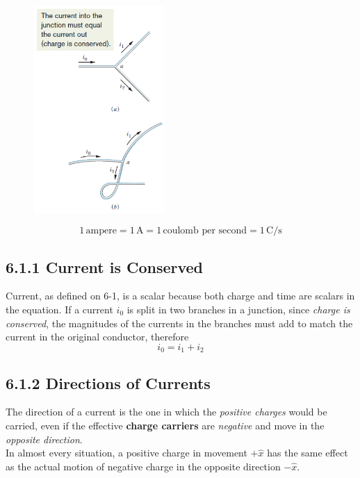 \documentclass[12pt, a4paper]{article}
\begin{document}
		\begin{figure}
			\centering
			\includegraphics[width=5cm]{Physics2_PNGs/current-is-conserved.png}
			\caption*{}
			\label{fig:current-is-conserved.png}
		\end{figure}
		
		\[
			1 \, \text{ampere} = 1 \, \text{A} = 1 \, \text{coulomb per second}
			= 1 \, \text{C} / \text{s}
		\]
		
		\subsection*{6.1.1 Current is Conserved}
		

		Current, as defined on 6-1, is a scalar because both charge and time are scalars in the equation. If a current $i_0$ is split in two branches in a junction, since \textit{charge is conserved}, the magnitudes of the currents in the branches must add to match the current in the original conductor, therefore
		\[
			i_0 = i_1 + i_2
			\tag{First Law of Kirchhoff, 6-3}
		\]
		
		
		\subsection*{6.1.2 Directions of Currents}
		
		The direction of a current is the one in which the \textit{positive charges} would be carried, even if the effective \textbf{charge carriers} are \textit{negative} and move in the \textit{opposite direction}. \\
		In almost every situation, a positive charge in movement $+ \hat{x}$ has the same effect as the actual motion of negative charge in the opposite direction 
		$- \hat{x}$.
		
\end{document}
